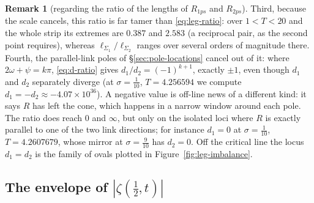 \documentclass[11pt]{article}
\theoremstyle{definition}
\newtheorem{remark}[theorem]{Remark}
\begin{document}
\begin{remark}[regarding the ratio of the lengths of $R_{1ps}$ and $R_{2ps}$]
Third, because the scale cancels, this ratio is far tamer than
\eqref{eq:leg-ratio}: over $1<T<20$ and the whole strip its extremes are
$0.387$ and $2.583$ (a reciprocal pair, as the second point requires), whereas
$\ell_{\Sigma_1}/\ell_{\Sigma_2}$ ranges over several orders of magnitude
there. Fourth, the parallel-link poles of \S\ref{sec:pole-locations} cancel out
of it: where $2\omega+\psi=k\pi$, \eqref{eq:d-ratio} gives
$d_1/d_2=(-1)^{k+1}$, exactly $\pm1$, even though $d_1$ and $d_2$ separately
diverge (at $\sigma=\tfrac1{10}$, $T=4.256594$ we compute
$d_1=-d_2\approx-4.07\times10^{36}$). A negative value is off-line news of a
different kind: it says $R$ has left the cone, which happens in a narrow window
around each pole. The ratio does reach $0$ and $\infty$, but only on the
isolated loci where $R$ is exactly parallel to one of the two link directions;
for instance $d_1=0$ at $\sigma=\tfrac1{10}$, $T=4.2607679$, whose mirror at
$\sigma=\tfrac9{10}$ has $d_2=0$. Off the critical line the locus $d_1=d_2$ is
the family of ovals plotted in Figure~\ref{fig:leg-imbalance}.
\end{remark}

\subsection{The envelope of $\left|\zeta\!\left(\tfrac12,t\right)\right|$}\label{sec:envelope}
\end{document}

